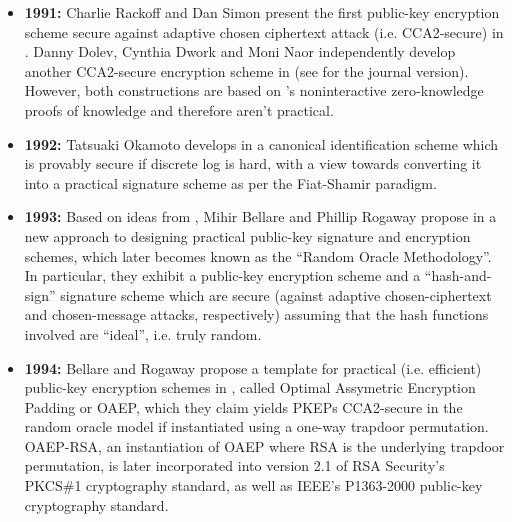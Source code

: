 \documentclass[12pt,twoside]{article}
\theoremstyle{plain}
\begin{document}
\begin{itemize}
\item {\bf 1991:} Charlie Rackoff and Dan Simon present the first 
public-key encryption scheme secure against adaptive chosen ciphertext attack
(i.e. CCA2-secure) in \cite{rackoff:cca2}. Danny Dolev, Cynthia
Dwork and Moni Naor independently develop another CCA2-secure encryption
scheme in \cite{dolev:nonmalleable1} (see \cite{dolev:nonmalleable2} for the
journal version). However, both constructions are based on
\cite{blum:noninterzerok}'s noninteractive zero-knowledge proofs of knowledge 
and therefore aren't practical.

\item {\bf 1992:} Tatsuaki Okamoto develops in \cite{okamoto:discretelogfs} a canonical identification scheme
which is provably secure if discrete log is hard, with a view towards
converting it into a practical signature scheme as per the Fiat-Shamir paradigm.

\item {\bf 1993:} Based on ideas from \cite{fiat:fsparadigm}, Mihir Bellare and Phillip Rogaway propose in 
\cite{bellare:rompractical} a new approach to designing practical public-key
signature and encryption schemes, which later becomes known as the ``Random Oracle
Methodology''. In particular, they exhibit a public-key encryption scheme and
a ``hash-and-sign'' signature scheme which are secure (against
adaptive chosen-ciphertext and chosen-message attacks, respectively) assuming that the
hash functions involved are ``ideal'', i.e. truly random.


\item {\bf 1994:} Bellare and Rogaway propose a template for practical (i.e.
efficient)
public-key encryption schemes in \cite{bellare:oaep}, called Optimal Assymetric Encryption Padding or
OAEP, which they claim yields PKEPs CCA2-secure in the random
oracle model if instantiated using a one-way trapdoor permutation. OAEP-RSA,
an instantiation of OAEP where RSA is the underlying trapdoor permutation,
is later incorporated into version 2.1 of RSA
Security's PKCS\#1 cryptography standard, as well as IEEE's P1363-2000
public-key cryptography standard.


\end{itemize}
\end{document}
